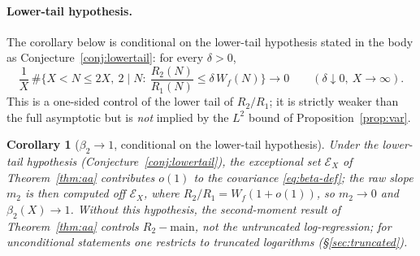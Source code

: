 \documentclass[]{interact}%
\newtheorem{corollary}{Corollary}
\begin{document}
\paragraph{Lower-tail hypothesis.}
The corollary below is conditional on the lower-tail hypothesis stated in the body as
Conjecture~\ref{conj:lowertail}: for every $\delta>0$,
\[
  \frac1X\,\#\Big\{X<N\le2X,\ 2\mid N:\ \frac{R_2(N)}{R_1(N)}\le\delta\,W_f(N)\Big\}\longrightarrow0
  \qquad(\delta\downarrow0,\ X\to\infty).
\]
This is a one-sided control of the lower tail of $R_2/R_1$; it is strictly weaker than the full
asymptotic but is \emph{not} implied by the $L^2$ bound of Proposition~\ref{prop:var}.

\begin{corollary}[$\beta_2\to1$, conditional on the lower-tail hypothesis]\label{cor:beta-aa}
Under the lower-tail hypothesis (Conjecture~\ref{conj:lowertail}), the exceptional set $\mathcal E_X$ of
Theorem~\ref{thm:aa} contributes $o(1)$ to the covariance \eqref{eq:beta-def}; the raw slope
$m_2$ is then computed off $\mathcal E_X$, where $R_2/R_1=W_f(1+o(1))$, so $m_2\to0$ and
$\beta_2(X)\to1$. Without
this hypothesis, the second-moment result of Theorem~\ref{thm:aa} controls $R_2-\mathrm{main}$,
not the untruncated log-regression; for unconditional statements one restricts to truncated
logarithms (\S\ref{sec:truncated}).
\end{corollary}
\end{document}
